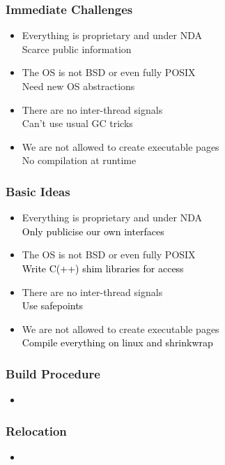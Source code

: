 \documentclass[14pt,t,aspectratio=169]{beamer}
\begin{document}
\begin{frame}
  \frametitle{Immediate Challenges}
  \begin{itemize}
  \item Everything is proprietary and under NDA \\
    \Rightarrow Scarce public information
  \item The OS is not BSD or even fully POSIX \\
    \Rightarrow Need new OS abstractions
  \item There are no inter-thread signals \\
    \Rightarrow Can't use usual GC tricks
  \item We are not allowed to create executable pages \\
    \Rightarrow No compilation at runtime
  \end{itemize}
\end{frame}

\begin{frame}
  \frametitle{Basic Ideas}
  \begin{itemize}
    \color{lightgray}
  \item Everything is proprietary and under NDA \\
    \textcolor{red}{\Rightarrow} \textcolor{black}{Only publicise our own interfaces}
  \item The OS is not BSD or even fully POSIX \\
    \textcolor{red}{\Rightarrow} \textcolor{black}{Write C(++) shim libraries for access}
  \item There are no inter-thread signals \\
    \textcolor{red}{\Rightarrow} \textcolor{black}{Use safepoints}
  \item We are not allowed to create executable pages \\
    \textcolor{red}{\Rightarrow} \textcolor{black}{Compile everything on linux and shrinkwrap}
  \end{itemize}
\end{frame}

\begin{frame}
  \frametitle{Build Procedure}
  \begin{itemize}
  \item 
  \end{itemize}
\end{frame}

\begin{frame}
  \frametitle{Relocation}
  \begin{itemize}
  \item 
  \end{itemize}
\end{frame}
\end{document}
